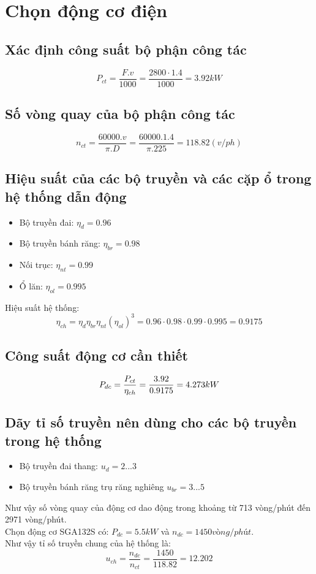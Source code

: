 \section{Chọn động cơ điện}
\subsection{Xác định công suất bộ phận công tác}
\[
    P_{ct} = \frac{F.v}{1000} = \frac{2800 \cdot 1.4}{1000} = 3.92 kW
\]
\subsection{Số vòng quay của bộ phận công tác}
\begin{center}
\[
    n_{ct} = \frac{60000.v}{\pi.D} = \frac{60000.1.4}{\pi.225} = 118.82 (v/ph)
\]
\end{center}
\subsection{Hiệu suất của các bộ truyền và các cặp ổ trong hệ thống dẫn động}
\begin{itemize}
    \item Bộ truyền đai: $\eta_{d} = 0.96$ 
    \item Bộ truyền bánh răng: $\eta_{br} = 0.98$
    \item Nối trục: $\eta_{nt} = 0.99$
    \item Ổ lăn: $\eta_{ol} = 0.995$
\end{itemize}
Hiệu suất hệ thống:
\[
    \eta _{ch} = \eta_{d}\eta_{br}\eta_{nt}(\eta_{ol})^3 = 0.96 \cdot 0.98 \cdot 0.99 \cdot 0.995 = 0.9175
\]
\subsection{Công suất động cơ cần thiết}
\[
    P_{dc} = \frac{P_{ct}}{\eta_{ch}} = \frac{3.92}{0.9175} = 4.273 kW\\
\]    
\subsection{Dãy tỉ số truyền nên dùng cho các bộ truyền trong hệ thống}

\begin{itemize}
    \item Bộ truyền đai thang: $u_{d} = 2...3$
    \item Bộ truyền bánh răng trụ răng nghiêng $u_{br} = 3...5$
\end{itemize}
Như vậy số vòng quay của động cơ dao động trong khoảng từ 713 vòng/phút đến 2971 vòng/phút.\\
Chọn động cơ SGA132S có: $P_{dc} = 5.5 kW$ và $n_{dc} = 1450 vòng/phút$. \\
Như vậy tỉ số truyền chung của hệ thống là:
\[
    u_{ch} =\frac{n_{dc}}{n_{ct}} = \frac{1450}{118.82} = 12.202
\]

